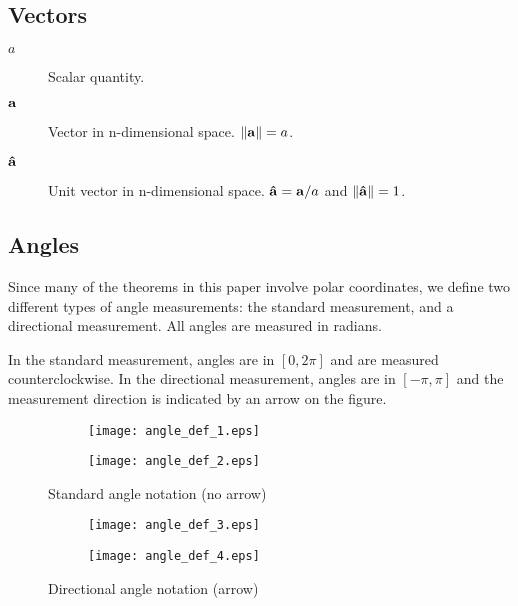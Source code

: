 \subsection{Vectors}

\begin{description}
  \item[$a$] Scalar quantity.
  \item[$\mathbf{a}$] Vector in n-dimensional space. $\norm{\bvec{a}} = a$.
  \item[$\mathbf{\hat{a}}$] Unit vector in n-dimensional space. $\mathbf{\hat{a}} = \mathbf{a}/a$ and $\norm{\bhat{a}} = 1$.
\end{description}

\subsection{Angles}

Since many of the theorems in this paper involve polar coordinates, we define two different types of angle measurements: the standard measurement, and a directional measurement. All angles are measured in radians.

In the standard measurement, angles are in $[0, 2\pi]$ and are measured counterclockwise. In the directional measurement, angles are in $[-\pi, \pi]$ and the measurement direction is indicated by an arrow on the figure.

\begin{figure}[H]
  \centering
  \begin{subfigure}[b]{0.4\textwidth}
    \texttt{[image: angle\_def\_1.eps]}
    \caption{}
    \label{fig:angle-def-1}
  \end{subfigure}
  \qquad \qquad
  \begin{subfigure}[b]{0.4\textwidth}
    \texttt{[image: angle\_def\_2.eps]}
    \caption{}
    \label{fig:angle-def-2}
  \end{subfigure}
  \caption{Standard angle notation (no arrow)}
\end{figure}

\begin{figure}[H]
  \begin{subfigure}[b]{0.4\textwidth}
    \texttt{[image: angle\_def\_3.eps]}
    \caption{}
    \label{fig:angle-def-3}
  \end{subfigure}
  \qquad \qquad
  \begin{subfigure}[b]{0.4\textwidth}
    \texttt{[image: angle\_def\_4.eps]}
    \caption{}
    \label{fig:angle-def-4}
  \end{subfigure}
  \caption{Directional angle notation (arrow)}
\end{figure}